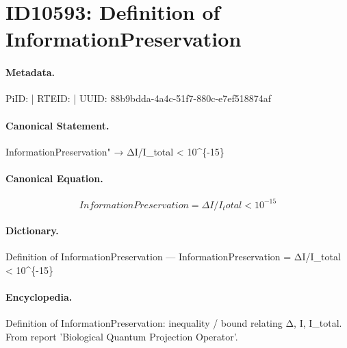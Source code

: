 \section*{ID10593: Definition of InformationPreservation}
\paragraph{Metadata.}
PiID:  | RTEID:  | UUID: 88b9bdda-4a4c-51f7-880c-e7ef518874af

\paragraph{Canonical Statement.}
InformationPreservation" → ΔI/I\_total < 10\textasciicircum{}\{-15\}

\paragraph{Canonical Equation.}
\[
InformationPreservation = ΔI/I_total < 10^{-15}
\]

\paragraph{Dictionary.}
Definition of InformationPreservation — InformationPreservation = ΔI/I\_total < 10\textasciicircum{}\{-15\}

\paragraph{Encyclopedia.}
Definition of InformationPreservation: inequality / bound relating Δ, I, I\_total. From report 'Biological Quantum Projection Operator'.
